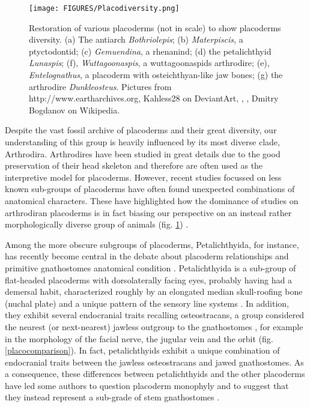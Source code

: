 \documentclass[11pt,letterpaper]{report}
\begin{document}
\begin{figure}[!h]
\centering
    \texttt{[image: FIGURES/Placodiversity.png]}
\caption{\footnotesize{Restoration of various placoderms (not in scale) to show placoderms diversity. (a) The antiarch \textit{Bothriolepis}; (b) \textit{Materpiscis}, a ptyctodontid; (c) \textit{Gemuendina}, a rhenanind; (d) the petalichthyid \textit{Lunaspis}; (f), \textit{Wuttagoonaspis}, a wuttagoonaspids arthrodire; (e), \textit{Entelognathus}, a placoderm with osteichthyan-like jaw bones; (g) the arthrodire \textit{Dunkleosteus}. Pictures from http://www.eartharchives.org, Kahless28 on DeviantArt, \citealt{Young2010}, \citealt{zhu2013silurian}, Dmitry Bogdanov on Wikipedia.}}
\label{placodiversity}
\end{figure}

Despite the vast fossil archive of placoderms and their great diversity, our understanding of this group is heavily influenced by its most diverse clade, Arthrodira. Arthrodires have been studied in great details due to the good preservation of their head skeleton and therefore are often used as the interpretive model for placoderms. However, recent studies focussed on less known sub-groups of placoderms have often found unexpected combinations of anatomical characters. These have highlighted how the dominance of studies on arthrodiran placoderms is in fact biasing our perspective on an instead rather morphologically diverse group of animals (fig. \ref{placodiversity}) \citep{long2009devonian,long2015copulation,Rucklin2012,brazeau2014characters,Dupret2014}.

Among the more obscure subgroups of placoderms, Petalichthyida, for instance, has recently become central in the debate about placoderm relationships and primitive gnathostomes anatomical condition \citep{Janvier1996a,brazeau2014characters}. Petalichthyida is a sub-group of flat-headed placoderms with dorsolaterally facing eyes, probably having had a demersal habit, characterized roughly by an elongated median skull-roofing bone (nuchal plate) and a unique pattern of the sensory line systems \citep{Denison1975,Zhu1991}. In addition, they exhibit several endocranial traits recalling osteostracans, a group considered the nearest (or next-nearest) jawless outgroup to the gnathostomes \citep{Donoghue2001,Donoghue2006}, for example in the morphology of the facial nerve, the jugular vein and the orbit (fig. \ref{placocomparison}). In fact, petalichthyids exhibit a unique combination of endocranial traits between the jawless osteostracans and jawed gnathostomes. As a consequence, these differences between petalichthyids and the other placoderms have led some authors to question placoderm monophyly and to suggest that they instead represent a sub-grade of stem gnathostomes \citep{brazeau2009braincase,davis2012,zhu2013silurian,Dupret2014,giles2015osteichthyan}. 
\end{document}
